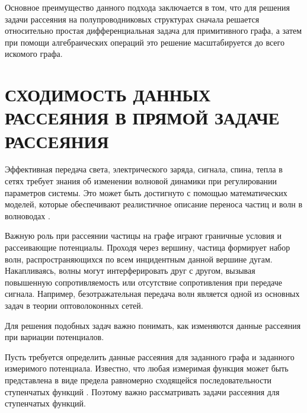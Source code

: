 \documentclass[a4 paper, 12 pt]{extarticle}
\begin{document}
   Основное преимущество данного подхода заключается в том, что для решения задачи рассеяния на полупроводниковых структурах сначала решается относительно простая дифференциальная задача для примитивного графа, а затем при помощи алгебраических операций это решение масштабируется до всего искомого графа.
   
   \section{СХОДИМОСТЬ ДАННЫХ РАССЕЯНИЯ В ПРЯМОЙ ЗАДАЧЕ РАССЕЯНИЯ}
   
   Эффективная передача света, электрического заряда, сигнала, спина, тепла в сетях требует знания об изменении волновой динамики при регулировании параметров системы. Это может быть достигнуто с помощью математических моделей, которые обеспечивают реалистичное описание переноса частиц и волн в волноводах \cite{TransparentQuantumGraphs}.
   
   Важную роль при рассеянии частицы на графе играют граничные условия и рассеивающие потенциалы. Проходя через вершину, частица формирует набор волн, распространяющихся по всем инцидентным данной вершине дугам. Накапливаясь, волны могут интерферировать друг с другом, вызывая повышенную сопротивляемость или отсутствие сопротивления при передаче сигнала.
   Например, безотражательная передача волн является одной из основных задач в теории оптоволоконных сетей.
   
   Для решения подобных задач важно понимать, как изменяются данные рассеяния при вариации потенциалов.

   Пусть требуется определить данные рассеяния для заданного графа и заданного измеримого потенциала. Известно, что любая измеримая функция может быть представлена в виде предела равномерно сходящейся последовательности ступенчатых функций \cite{Kolmogorov}. Поэтому важно рассматривать задачи рассеяния для ступенчатых функций.
   
\end{document}
